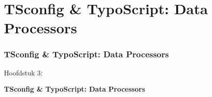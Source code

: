 %

\section{TSconfig \& TypoScript: Data Processors}
\begin{frame}[fragile]
	\frametitle{TSconfig \& TypoScript: Data Processors}

	\begin{center}\huge{Hoofdstuk 3:}\end{center}
	\begin{center}\huge{\color{typo3darkgrey}\textbf{TSconfig \& TypoScript: Data Processors}}\end{center}

\end{frame}


